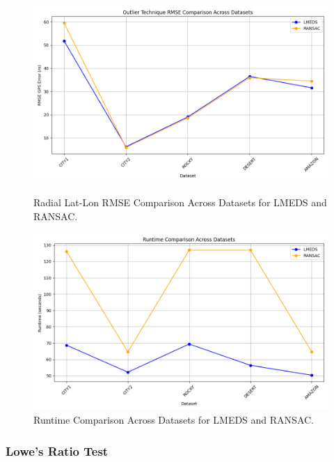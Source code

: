 \begin{figure}[H]
    \centering
    \begin{minipage}{0.45\textwidth}
        \centering
        \includegraphics[width=\textwidth]{./Chapter 4/testresults/ransaclmedsrmse.png}
        \caption{Radial Lat-Lon RMSE Comparison Across Datasets for LMEDS and RANSAC.}
        \label{fig:rmse_comparisonlmeds}
    \end{minipage}\hfill
    \begin{minipage}{0.45\textwidth}
        \centering
        \includegraphics[width=\textwidth]{./Chapter 4/testresults/ransaclmedsruntime.png}
        \caption{Runtime Comparison Across Datasets for LMEDS and RANSAC.}
        \label{fig:runtime_comparisonlmeds}
    \end{minipage}
\end{figure}




\subsubsection*{Lowe's Ratio Test}

